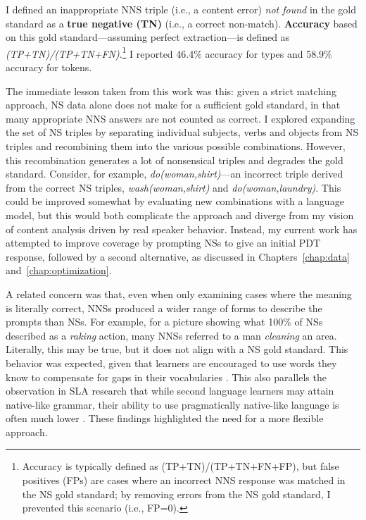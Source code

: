 I defined an inappropriate NNS triple (i.e., a content error)
\textit{not found} in the gold standard as a \textbf{true negative
  (TN)} (i.e., a correct non-match). \textbf{Accuracy} based on this
gold standard---assuming perfect extraction---is defined as
\textit{(TP+TN)/(TP+TN+FN)}.\footnote{Accuracy is typically defined as (TP+TN)/(TP+TN+FN+FP), but false positives (FPs) are cases where an incorrect NNS response was matched in the NS gold standard; by removing errors from the NS gold standard, I prevented this scenario (i.e., FP=0).} I reported 46.4\% accuracy for types and 58.9\% accuracy for tokens.

The immediate lesson taken from this work was this: given a strict matching approach, NS data alone does not make for a sufficient gold standard, in that many appropriate NNS answers are not counted as correct. I explored expanding the set of NS triples by separating individual subjects, verbs and objects from NS triples and recombining them into the various possible combinations. However, this recombination generates a lot of nonsensical triples and degrades the gold standard. Consider, for example, \textit{do(woman,shirt)}---an incorrect triple derived from the correct NS triples, \textit{wash(woman,shirt)} and \textit{do(woman,laundry)}. This could be improved somewhat by evaluating new combinations with a language model, but this would both complicate the approach and diverge from my vision of content analysis driven by real speaker behavior. Instead, my current work has attempted to improve coverage by prompting NSs to give an initial PDT response, followed by a second alternative, as discussed in Chapters~\ref{chap:data} and~\ref{chap:optimization}.

A related concern was that, even when only examining cases
where the meaning is literally correct, NNSs produced a wider range of
forms to describe the prompts than NSs. For example, for a picture
showing what 100\% of NSs described as a \textit{raking} action,
many NNSs referred to a man \textit{cleaning} an area. Literally,
this may be true, but it does not align with a NS gold standard. 
This behavior was expected, given that learners are encouraged
to use words they know to compensate for gaps in their vocabularies
\citep{AgustinLlach2010}. This also parallels the observation in SLA research that while second language learners may attain native-like grammar, their ability to use
pragmatically native-like language is often much lower
\citep{BardoviDornyei1998}. These findings highlighted the need for a more flexible approach.

